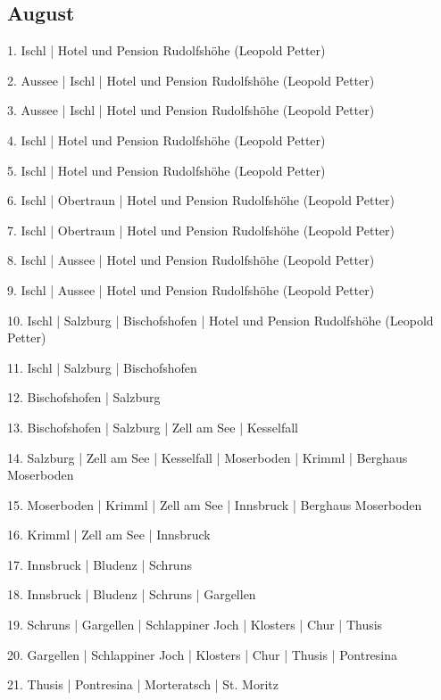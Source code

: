 \documentclass[twoside=false,titlepage=false,open=any, parskip=never, fontsize=10pt, headings=small, chapterprefix=false, appendixprefix=false, DIV=15]{scrbook}
\begin{document}
\begin{multicols}{3}
            \section*{August}
            1. Ischl | Hotel und Pension Rudolfshöhe (Leopold Petter)\par
            2. Aussee | Ischl | Hotel und Pension Rudolfshöhe (Leopold Petter)\par
            3. Aussee | Ischl | Hotel und Pension Rudolfshöhe (Leopold Petter)\par
            4. Ischl | Hotel und Pension Rudolfshöhe (Leopold Petter)\par
            5. Ischl | Hotel und Pension Rudolfshöhe (Leopold Petter)\par
            6. Ischl | Obertraun | Hotel und Pension Rudolfshöhe (Leopold Petter)\par
            7. Ischl | Obertraun | Hotel und Pension Rudolfshöhe (Leopold Petter)\par
            8. Ischl | Aussee | Hotel und Pension Rudolfshöhe (Leopold Petter)\par
            9. Ischl | Aussee | Hotel und Pension Rudolfshöhe (Leopold Petter)\par
            10. Ischl | Salzburg | Bischofshofen | Hotel und Pension Rudolfshöhe (Leopold Petter)\par
            11. Ischl | Salzburg | Bischofshofen\par
            12. Bischofshofen | Salzburg\par
            13. Bischofshofen | Salzburg | Zell am See | Kesselfall\par
            14. Salzburg | Zell am See | Kesselfall | Moserboden | Krimml | Berghaus Moserboden\par
            15. Moserboden | Krimml | Zell am See | Innsbruck | Berghaus Moserboden\par
            16. Krimml | Zell am See | Innsbruck\par
            17. Innsbruck | Bludenz | Schruns\par
            18. Innsbruck | Bludenz | Schruns | Gargellen\par
            19. Schruns | Gargellen | Schlappiner Joch | Klosters | Chur | Thusis\par
            20. Gargellen | Schlappiner Joch | Klosters | Chur | Thusis | Pontresina\par
            21. Thusis | Pontresina | Morteratsch | St. Moritz\par

\end{multicols}
\end{document}
